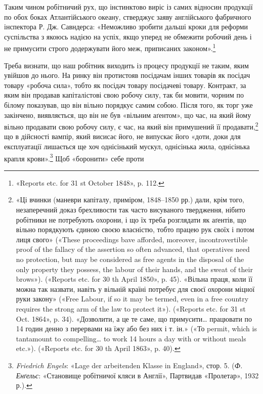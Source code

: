 Таким чином робітничий рух, що інстинктово виріс із самих
відносин продукції по обох боках Атлантійського океану, стверджує
заяву англійського фабричного інспектора Р. Дж. Савндерса:
«Неможливо зробити дальші кроки для реформи суспільства
з якоюсь надією на успіх, якщо уперед не обмежити робочий
день і не примусити строго додержувати його меж, приписаних
законом».\footnote{
«Reports etc. for 31 st October 1848», p. 112.
}

Треба визнати, що наш робітник виходить із процесу продукції
не таким, яким увійшов до нього. На ринку він протистояв
посідачам інших товарів як посідач товару «робоча сила», тобто
як посідач товару посідачеві товару. Контракт, за яким він продавав
капіталістові свою робочу силу, так би мовити, чорним по
білому показував, що він вільно порядкує самим собою. Після того,
як торг уже закінчено, виявляється, що він не був «вільним
аґентом», що час, на який йому вільно продавати свою робочу
силу, є час, на який він примушений її продавати,\footnote{
«Ці вчинки (маневри капіталу, приміром, 1848--1850 рр.) дали,
крім того, незаперечний доказ брехливости так часто висуваного твердження,
нібито робітники не потребують охорони, і що їх треба розглядати
як аґентів, що вільно порядкують єдиною своєю власністю, тобто
працею рук своїх і потом лиця свого» («These proceedings bave afforded,
moreover, incontrovertible proof of the fallacy of the assertion so often
advanced, that operatives need no protection, but may be considered as
free agents in the disposal of the only property they possess, the labour of
their hands, and the sweat of their brows»). («Reports etc. for 30 th April
1850», p. 45). «Вільна праця, коли її можна так назвати, навіть у вільній
країні потребує для своєї охорони міцної руки закону» («Free Labour,
if so it may be termed, even in a free country requires the strong arm of
the law to protect it»). («Reports etc. for 31 st Oct. 1864», p. 34). «Дозволити,
а це те саме, що примусити\dots{} працювати по 14 годин денно з перервами
на їжу або без них і т. ін.» («То permit, which is tantamount to
compelling\dots{} to work 14 hours a day with or without meals etc.»). («Reports
etc. for 30 th April 1863», p. 40).
} що в дійсності
вампір, який висисає його, не випускає його «доти, доки для
експлуатації лишається ще хоч однісінький мускул, однісінька
жила, однісінька крапля крови».\footnote{
\emph{Friedrich Engels}: «Lage der arbeitenden Klasse in England»,
стор. 5. (\emph{Ф. Енґельс}: «Становище робітничої кляси в Англії», Партвидав
«Пролетар», 1932 р.).
} Щоб «боронити» себе проти
